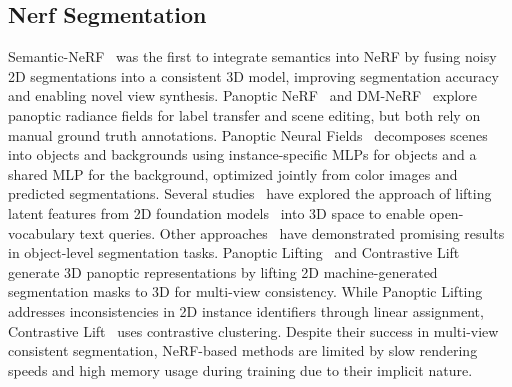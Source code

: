 \subsection{Nerf Segmentation}
Semantic-NeRF~\cite{zhi2021place} was the first to integrate semantics into NeRF by fusing noisy 2D segmentations into a consistent 3D model, improving segmentation accuracy and enabling novel view synthesis. Panoptic NeRF~\cite{fu2022panoptic} and DM-NeRF~\cite{wang2022dm} explore panoptic radiance fields for label transfer and scene editing, but both rely on manual ground truth annotations. Panoptic Neural Fields~\cite{kundu2022panoptic} decomposes scenes into objects and backgrounds using instance-specific MLPs for objects and a shared MLP for the background, optimized jointly from color images and predicted segmentations.
Several studies~\cite{kerr2023lerf,liu2023weakly} have explored the approach of lifting latent features from 2D foundation models~\cite{radford2021learning} into 3D space to enable open-vocabulary text queries. Other approaches~\cite{shen2023distilled,goel2023interactive,wei2024nto3d,kim2024garfield} have demonstrated promising results in object-level segmentation tasks. Panoptic Lifting~\cite{siddiqui2023panoptic} and Contrastive Lift~\cite{bhalgat2023contrastive} generate 3D panoptic representations by lifting 2D machine-generated segmentation masks to 3D for multi-view consistency. While Panoptic Lifting~\cite{siddiqui2023panoptic} addresses inconsistencies in 2D instance identifiers through linear assignment, Contrastive Lift~\cite{bhalgat2023contrastive} uses contrastive clustering. Despite their success in multi-view consistent segmentation, NeRF-based methods are limited by slow rendering speeds and high memory usage during training due to their implicit nature.

